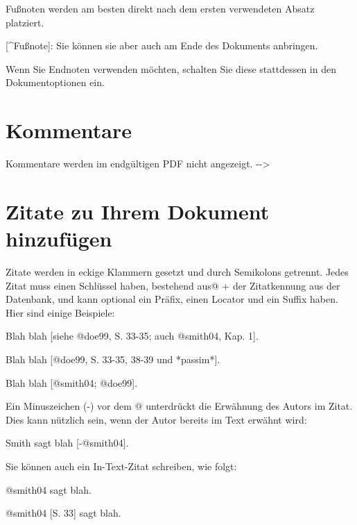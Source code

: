 \documentclass[
  12pt,
  nswissgerman,
  twoside,
  openright]{report}
\newenvironment{Shaded}{\begin{snugshade}}{\end{snugshade}}
\newcommand{\NormalTok}[1]{#1}
\newcommand{\OtherTok}[1]{\textcolor[rgb]{0.56,0.35,0.01}{#1}}
\begin{document}
\begin{Shaded}
\begin{Highlighting}[]
\NormalTok{Fußnoten werden am besten direkt nach dem ersten verwendeten Absatz platziert.}

\OtherTok{[\^{}Fußnote]}\NormalTok{: Sie können sie aber auch am Ende des Dokuments anbringen.}
\end{Highlighting}
\end{Shaded}

Wenn Sie Endnoten verwenden möchten, schalten Sie diese stattdessen in
den Dokumentoptionen ein.

\hypertarget{kommentare}{%
\section{Kommentare}\label{kommentare}}

\begin{Shaded}
\begin{Highlighting}[]
\NormalTok{Kommentare werden im endgültigen PDF nicht angezeigt. {-}{-}>}
\end{Highlighting}
\end{Shaded}

\hypertarget{zitate-zu-ihrem-dokument-hinzufuxfcgen}{%
\section{Zitate zu Ihrem Dokument
hinzufügen}\label{zitate-zu-ihrem-dokument-hinzufuxfcgen}}

\begin{Shaded}
\begin{Highlighting}[]
\NormalTok{Zitate werden in eckige Klammern gesetzt und durch Semikolons getrennt. Jedes Zitat muss einen Schlüssel haben, bestehend aus\textquotesingle{}@\textquotesingle{} + der Zitatkennung aus der Datenbank, und kann optional ein Präfix, einen Locator und ein Suffix haben. Hier sind einige Beispiele:}

\NormalTok{Blah blah [siehe @doe99, S. 33{-}35; auch @smith04, Kap. 1].}

\NormalTok{Blah blah [@doe99, S. 33{-}35, 38{-}39 und *passim*].}

\NormalTok{Blah blah [@smith04; @doe99].}

\NormalTok{Ein Minuszeichen ({-}) vor dem @ unterdrückt die Erwähnung des Autors im Zitat. Dies kann nützlich sein, wenn der Autor bereits im Text erwähnt wird:}

\NormalTok{Smith sagt blah [{-}@smith04].}

\NormalTok{Sie können auch ein In{-}Text{-}Zitat schreiben, wie folgt:}

\NormalTok{@smith04 sagt blah.}

\NormalTok{@smith04 [S. 33] sagt blah.}
\end{Highlighting}
\end{Shaded}
\end{document}
